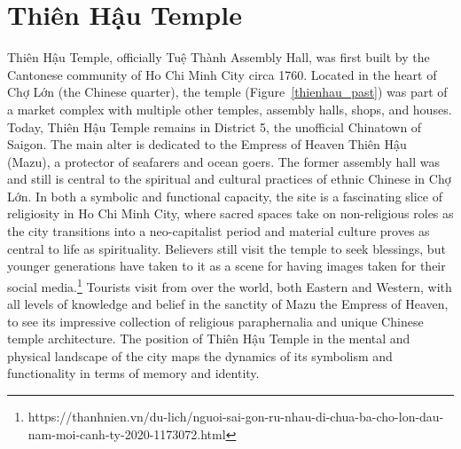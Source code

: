 \section{\vi Thiên Hậu Temple}
\vi
Thiên Hậu Temple, officially Tuệ Thành Assembly Hall, was first built by the Cantonese community of Ho Chi Minh City circa 1760. Located in the heart of Chợ Lớn (the Chinese quarter), the temple (Figure~\ref{thienhau_past}) was part of a market complex with multiple other temples, assembly halls, shops, and houses. Today, Thiên Hậu Temple remains in District 5, the unofficial Chinatown of Saigon. The main alter is dedicated to the Empress of Heaven Thiên Hậu (Mazu), a protector of seafarers and ocean goers. The former assembly hall was and still is central to the spiritual and cultural practices of ethnic Chinese in Chợ Lớn. In both a symbolic and functional capacity, the site is a fascinating slice of religiosity in Ho Chi Minh City, where sacred spaces take on non-religious roles as the city transitions into a neo-capitalist period and material culture proves as central to life as spirituality. Believers still visit the temple to seek blessings, but younger generations have taken to it as a scene for having images taken for their social media.\footnote{https://thanhnien.vn/du-lich/nguoi-sai-gon-ru-nhau-di-chua-ba-cho-lon-dau-nam-moi-canh-ty-2020-1173072.html} Tourists visit from over the world, both Eastern and Western, with all levels of knowledge and belief in the sanctity of Mazu the Empress of Heaven, to see its impressive collection of religious paraphernalia and unique Chinese temple architecture. The position of Thiên Hậu Temple in the mental and physical landscape of the city maps the dynamics of its symbolism and functionality in terms of memory and identity.
 \en

